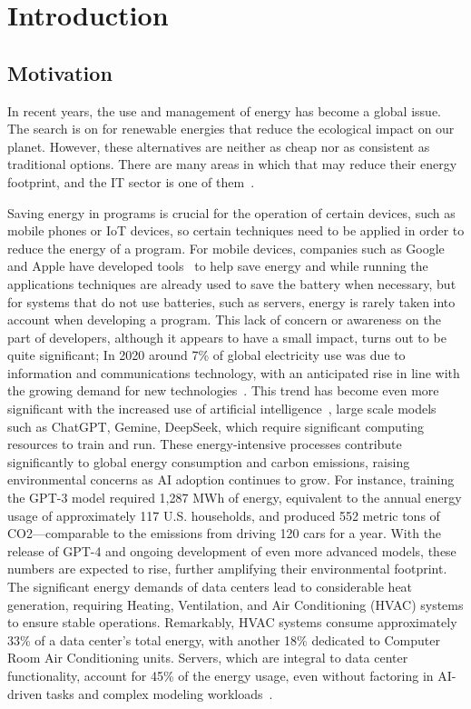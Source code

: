 


\chapter{Introduction}

\section{Motivation}

In recent years, the use and management of energy has become a global issue. The search is on for renewable energies that reduce the ecological impact on our planet. However, these alternatives are neither as cheap nor as consistent as traditional options. There are many areas in which that may reduce their energy footprint, and the IT sector is one of them~\cite{annurev:/content/journals/10.1146/annurev.resource.102308.124234,10.1145/1666420.1666438}.

Saving energy in programs is crucial for the operation of certain devices, such as mobile phones or IoT devices, so certain techniques need to be applied in order to reduce the energy of a program. For mobile devices, companies such as Google and Apple have developed tools~\cite{google_adaptive_battery,google_battery_saver,apple_clean_energy, android_power_profiler} to help save energy and while running the applications techniques are already used to save the battery when necessary, but for systems that do not use batteries, such as servers, energy is rarely taken into account when developing a program. This lack of concern or awareness on the part of developers, although it appears to have a small impact, turns out to be quite significant; In 2020 around 7\% of global electricity use was due to information and communications technology, with an anticipated rise in line with the growing demand for new technologies~\cite{article}. This trend has become even more significant with the increased use of artificial intelligence~\cite{patterson2021carbon}, large scale models such as ChatGPT, Gemine, DeepSeek, which require significant computing resources to train and run. These energy-intensive processes contribute significantly to global energy consumption and carbon emissions, raising environmental concerns as AI adoption continues to grow. For instance, training the GPT-3 model required 1,287 MWh of energy, equivalent to the annual energy usage of approximately 117 U.S. households, and produced 552 metric tons of CO2—comparable to the emissions from driving 120 cars for a year. With the release of GPT-4 and ongoing development of even more advanced models, these numbers are expected to rise, further amplifying their environmental footprint. The significant energy demands of data centers lead to considerable heat generation, requiring Heating, Ventilation, and Air Conditioning (HVAC) systems to ensure stable operations. Remarkably, HVAC systems consume approximately 33\% of a data center's total energy, with another 18\% dedicated to Computer Room Air Conditioning units. Servers, which are integral to data center functionality, account for 45\% of the energy usage, even without factoring in AI-driven tasks and complex modeling workloads~\cite{balaras2017high}.

